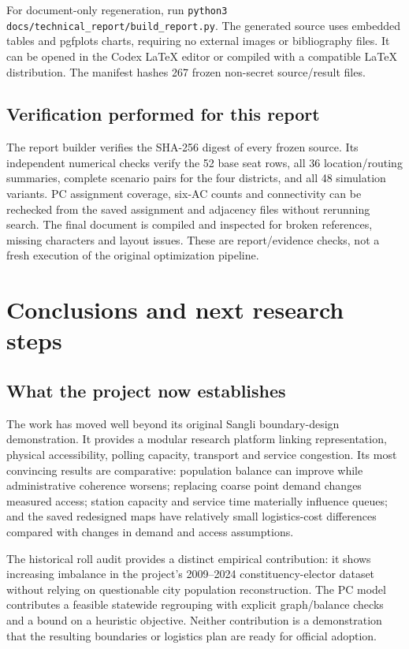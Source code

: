 \documentclass[11pt,a4paper,oneside]{report}
\begin{document}
For document-only regeneration, run \texttt{python3 docs/technical\_report/build\_report.py}. The generated source uses embedded tables and pgfplots charts, requiring no external images or bibliography files. It can be opened in the Codex \LaTeX{} editor or compiled with a compatible \LaTeX{} distribution. The manifest hashes 267 frozen non-secret source/result files.

\section{Verification performed for this report}
The report builder verifies the SHA-256 digest of every frozen source. Its independent numerical checks verify the 52 base seat rows, all 36 location/routing summaries, complete scenario pairs for the four districts, and all 48 simulation variants. PC assignment coverage, six-AC counts and connectivity can be rechecked from the saved assignment and adjacency files without rerunning search. The final document is compiled and inspected for broken references, missing characters and layout issues. These are report/evidence checks, not a fresh execution of the original optimization pipeline.

\chapter{Conclusions and next research steps}
\section{What the project now establishes}
The work has moved well beyond its original Sangli boundary-design demonstration. It provides a modular research platform linking representation, physical accessibility, polling capacity, transport and service congestion. Its most convincing results are comparative: population balance can improve while administrative coherence worsens; replacing coarse point demand changes measured access; station capacity and service time materially influence queues; and the saved redesigned maps have relatively small logistics-cost differences compared with changes in demand and access assumptions.

The historical roll audit provides a distinct empirical contribution: it shows increasing imbalance in the project's 2009--2024 constituency-elector dataset without relying on questionable city population reconstruction. The PC model contributes a feasible statewide regrouping with explicit graph/balance checks and a bound on a heuristic objective. Neither contribution is a demonstration that the resulting boundaries or logistics plan are ready for official adoption.
\end{document}
